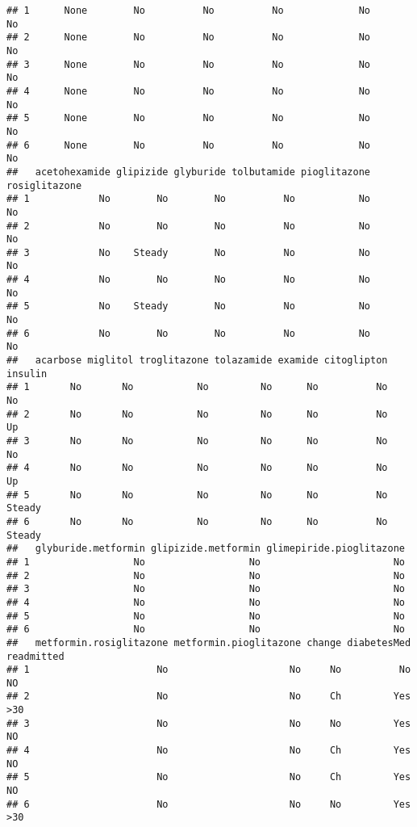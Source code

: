 \documentclass[
]{article}
\begin{document}
\begin{verbatim}
## 1      None        No          No          No             No          No
## 2      None        No          No          No             No          No
## 3      None        No          No          No             No          No
## 4      None        No          No          No             No          No
## 5      None        No          No          No             No          No
## 6      None        No          No          No             No          No
##   acetohexamide glipizide glyburide tolbutamide pioglitazone rosiglitazone
## 1            No        No        No          No           No            No
## 2            No        No        No          No           No            No
## 3            No    Steady        No          No           No            No
## 4            No        No        No          No           No            No
## 5            No    Steady        No          No           No            No
## 6            No        No        No          No           No            No
##   acarbose miglitol troglitazone tolazamide examide citoglipton insulin
## 1       No       No           No         No      No          No      No
## 2       No       No           No         No      No          No      Up
## 3       No       No           No         No      No          No      No
## 4       No       No           No         No      No          No      Up
## 5       No       No           No         No      No          No  Steady
## 6       No       No           No         No      No          No  Steady
##   glyburide.metformin glipizide.metformin glimepiride.pioglitazone
## 1                  No                  No                       No
## 2                  No                  No                       No
## 3                  No                  No                       No
## 4                  No                  No                       No
## 5                  No                  No                       No
## 6                  No                  No                       No
##   metformin.rosiglitazone metformin.pioglitazone change diabetesMed readmitted
## 1                      No                     No     No          No         NO
## 2                      No                     No     Ch         Yes        >30
## 3                      No                     No     No         Yes         NO
## 4                      No                     No     Ch         Yes         NO
## 5                      No                     No     Ch         Yes         NO
## 6                      No                     No     No         Yes        >30
\end{verbatim}
\end{document}
